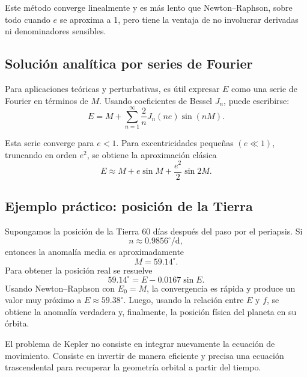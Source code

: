 Este método converge linealmente y es más lento que Newton--Raphson, sobre todo cuando \(e\) se aproxima a 1, pero tiene la ventaja de no involucrar derivadas ni denominadores sensibles.

\subsection{Solución analítica por series de Fourier}
Para aplicaciones teóricas y perturbativas, es útil expresar \(E\) como una serie de Fourier en términos de \(M\). Usando coeficientes de Bessel \(J_n\), puede escribirse:
\[
 E = M + \sum_{n=1}^{\infty} \frac{2}{n}J_n(ne)\sin(nM).
\]

Esta serie converge para \(e<1\). Para excentricidades pequeñas \((e \ll 1)\), truncando en orden \(e^2\), se obtiene la aproximación clásica
\[
 E \approx M + e\sin M + \frac{e^2}{2}\sin 2M.
\]

\subsection{Ejemplo práctico: posición de la Tierra}
Supongamos la posición de la Tierra 60 días después del paso por el periapsis. Si
\[
 n \approx 0.9856^\circ/\text{d},
\]
entonces la anomalía media es aproximadamente
\[
 M = 59.14^\circ.
\]
Para obtener la posición real se resuelve
\[
 59.14^\circ = E - 0.0167\sin E.
\]
Usando Newton--Raphson con \(E_0=M\), la convergencia es rápida y produce un valor muy próximo a \(E \approx 59.38^\circ\). Luego, usando la relación entre \(E\) y \(f\), se obtiene la anomalía verdadera y, finalmente, la posición física del planeta en su órbita.

\begin{importante}
El problema de Kepler no consiste en integrar nuevamente la ecuación de movimiento. Consiste en invertir de manera eficiente y precisa una ecuación trascendental para recuperar la geometría orbital a partir del tiempo.
\end{importante}

